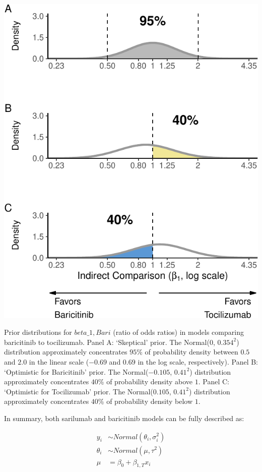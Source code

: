 \documentclass[
  12pt,
]{article}
\begin{document}
\begin{center}\includegraphics{supplementary_material_files/figure-latex/unnamed-chunk-2-1} \end{center}

Prior distributions for \(beta\_{1, Bari}\) (ratio of odds ratios) in
models comparing baricitinib to tocilizumab. Panel A: `Skeptical' prior.
The Normal(\(0\), \(0.354^2\)) distribution approximately concentrates
\(95\)\% of probability density between \(0.5\) and \(2.0\) in the
linear scale (\(-0.69\) and \(0.69\) in the log scale, respectively).
Panel B: `Optimistic for Baricitinib' prior. The Normal(\(-0.105\),
\(0.41^2\)) distribution approximately concentrates \(40\)\% of
probability density above \(1\). Panel C: `Optimistic for Tocilizumab'
prior. The Normal(\(0.105\), \(0.41^2\)) distribution approximately
concentrates \(40\)\% of probability density below \(1\).

\newpage

In summary, both sarilumab and baricitinib models can be fully described
as:

\begin{align*}
y_i & \sim Normal(\theta_i, \sigma_i^2)\\
\theta_i & \sim Normal(\mu, \tau^2)\\
\mu &= \beta_0 + \beta_{1, T} x_i\\
\end{align*}
\end{document}
